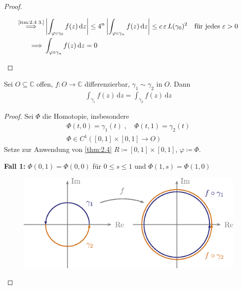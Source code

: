 \documentclass[a4paper,10pt]{scrbook}
\begin{document}
\begin{theorem}
\begin{proof}
\begin{enum-arab}
\begin{gather*}
        \begin{aligned}
          \overset{\text{\ref{itm:2.4 3.}}}{\implies}& \left| \int_{\varphi \circ \gamma_0} f(z) \, \mathrm{d}z \right|
          \leq 4^n \left| \int_{\varphi \circ \gamma_n} f(z) \, \mathrm{d}z \right| \leq c \, \varepsilon \, L(\gamma_0)^2 \quad \text{für jedes } \varepsilon > 0 \\
          \implies& \int_{\varphi \circ \gamma_n} f(z) \, \mathrm{d}z = 0
        \end{aligned}
      \end{gather*}
    \end{enum-arab}
  \end{proof}
\end{theorem}

\begin{notice}[Folgerung] \label{thm:2.5}
  Sei $O \subseteq \mathbb{C}$ offen, $f : O \to \mathbb{C}$ differenzierbar, $\gamma_1 \sim \gamma_2$ in $O$. Dann
  \begin{align*}
    \int_{\gamma_1} f(z) \, \mathrm{d}z = \int_{\gamma_2} f(z) \, \mathrm{d}z
  \end{align*}

  \begin{proof}
    Sei $\Phi$ die Homotopie, insbesondere
    \begin{gather*}
      \Phi(t,0) = \gamma_1(t) \; , \quad \Phi(t,1) = \gamma_2(t) \\
      \Phi \in C^1([0,1] \times [0,1] \to O)
    \end{gather*}
    Setze zur Anwendung von \ref{thm:2.4} $R \coloneq [0,1] \times [0,1]$, $\varphi \coloneq \Phi$.

    \textbf{Fall 1:} $\Phi(0,1) = \Phi(0,0)$ für $0 \leq s \leq 1$ und $\Phi(1,s) = \Phi(1,0)$

    \begin{figure}[H]
      \centering
      \includegraphics[scale=0.2]{images/ana3-tmp-15}
    \end{figure}


\end{proof}
\end{notice}
\end{document}
